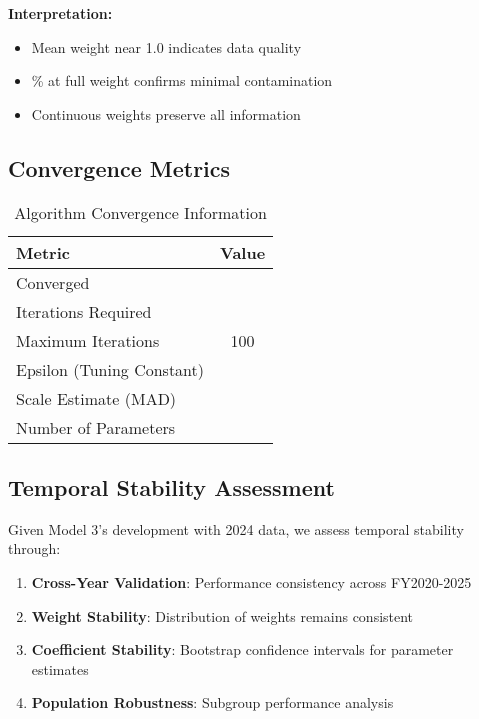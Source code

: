 \textbf{Interpretation:}
\begin{itemize}
    \item Mean weight near 1.0 indicates data quality
    \item \ModelThreeFullWeightPct{}\% at full weight confirms minimal contamination
    \item Continuous weights preserve all information
\end{itemize}

\subsection{Convergence Metrics}

\begin{table}[ht]
\centering
\caption{Algorithm Convergence Information}
\begin{tabular}{lc}
\toprule
\textbf{Metric} & \textbf{Value} \\
\midrule
Converged & \ModelThreeConverged{} \\
Iterations Required & \ModelThreeNumIterations{} \\
Maximum Iterations & 100 \\
Epsilon (Tuning Constant) & \ModelThreeEpsilon{} \\
Scale Estimate (MAD) & \ModelThreeScaleEstimate{} \\
Number of Parameters & \ModelThreeParameters{} \\
\bottomrule
\end{tabular}
\end{table}

\subsection{Temporal Stability Assessment}

Given Model 3's development with 2024 data, we assess temporal stability through:

\begin{enumerate}
    \item \textbf{Cross-Year Validation}: Performance consistency across FY2020-2025
    \item \textbf{Weight Stability}: Distribution of weights remains consistent
    \item \textbf{Coefficient Stability}: Bootstrap confidence intervals for parameter estimates
    \item \textbf{Population Robustness}: Subgroup performance analysis
\end{enumerate}

